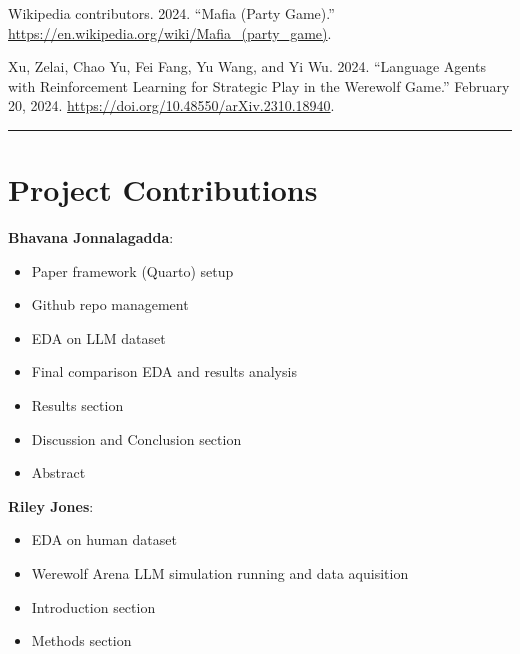 \documentclass[
  letterpaper,
  DIV=11,
  numbers=noendperiod]{scrreprt}
\newlength{\cslhangindent}
\newenvironment{CSLReferences}[2] %
 {\begin{list}{}{%
  \setlength{\itemindent}{0pt}
  \setlength{\leftmargin}{0pt}
  \setlength{\parsep}{0pt}
  \ifodd #1
   \setlength{\leftmargin}{\cslhangindent}
   \setlength{\itemindent}{-1\cslhangindent}
  \fi
  \setlength{\itemsep}{#2\baselineskip}}}
 {\end{list}}
\providecommand{\tightlist}{%
  \setlength{\itemsep}{0pt}\setlength{\parskip}{0pt}}
\begin{document}
\begin{CSLReferences}{1}{0}
Wikipedia contributors. 2024. {``Mafia (Party Game).''}
\url{https://en.wikipedia.org/wiki/Mafia_(party_game)}.

Xu, Zelai, Chao Yu, Fei Fang, Yu Wang, and Yi Wu. 2024. {``Language
{Agents} with {Reinforcement Learning} for {Strategic Play} in the
{Werewolf Game}.''} February 20, 2024.
\url{https://doi.org/10.48550/arXiv.2310.18940}.

\end{CSLReferences}

\begin{center}\rule{0.5\linewidth}{0.5pt}\end{center}

\chapter{Project Contributions}\label{project-contributions}

\textbf{Bhavana Jonnalagadda}:

\begin{itemize}
\tightlist
\item
  Paper framework (Quarto) setup
\item
  Github repo management
\item
  EDA on LLM dataset
\item
  Final comparison EDA and results analysis
\item
  Results section
\item
  Discussion and Conclusion section
\item
  Abstract
\end{itemize}

\textbf{Riley Jones}:

\begin{itemize}
\tightlist
\item
  EDA on human dataset
\item
  Werewolf Arena LLM simulation running and data aquisition
\item
  Introduction section
\item
  Methods section
\end{itemize}
\end{document}

